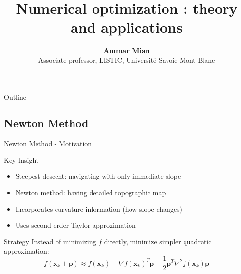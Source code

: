 \documentclass[aspectratio=1610]{beamer}
\title[Numerical optimization]{Numerical optimization : theory and applications}
\date[]{}
\author[AM]{\textbf{Ammar Mian} \\ \footnotesize Associate professor, LISTIC, Université Savoie Mont Blanc}
\begin{document}


  
\begin{frame}
\titlepage
\end{frame}
\begingroup
{}
\begin{frame}{Outline}
    \tableofcontents[]
\end{frame}

\endgroup






\subsection{Newton Method}

\begin{frame}{Newton Method - Motivation}
  \begin{block}{Key Insight}
    \begin{itemize}
      \item Steepest descent: navigating with only immediate slope
      \item Newton method: having detailed topographic map
      \item Incorporates curvature information (how slope changes)
      \item Uses second-order Taylor approximation
    \end{itemize}
  \end{block}
  
  \vspace{0.5cm}
  \begin{block}{Strategy}
    Instead of minimizing $f$ directly, minimize simpler quadratic approximation:
    $$f(\mathbf{x}_k + \mathbf{p}) \approx f(\mathbf{x}_k) + \nabla f(\mathbf{x}_k)^T\mathbf{p} + \frac{1}{2}\mathbf{p}^T\nabla^2 f(\mathbf{x}_k)\mathbf{p}$$
  \end{block}
\end{frame}
\end{document}
